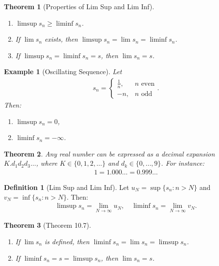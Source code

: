 \documentclass[7pt]{article}
\theoremstyle{definition}
\newtheorem{definition}{Definition}
\theoremstyle{plain}
\newtheorem{theorem}{Theorem}
\newtheorem{example}{Example}
\begin{document}
\begin{theorem}[Properties of Lim Sup and Lim Inf]

\begin{enumerate}
    \item $ \limsup s_n \geq \liminf s_n $.
    \item If $ \lim s_n $ exists, then $ \limsup s_n = \lim s_n = \liminf s_n $.
    \item If $ \limsup s_n = \liminf s_n = s $, then $ \lim s_n = s $.
\end{enumerate}
\end{theorem}

\begin{example}[Oscillating Sequence]
Let \begin{align} s_n = 
\begin{cases} 
\frac{1}{n}, & n \text{ even} \\
-n, & n \text{ odd}
\end{cases}.
\end{align}
Then:
\begin{enumerate}
    \item $ \limsup s_n = 0 $,
    \item $ \liminf s_n = -\infty $.
\end{enumerate}
\end{example}

\begin{theorem}
Any real number can be expressed as a decimal expansion $ K.d_1d_2d_3\ldots $, where $ K \in \{0, 1, 2, \dots \} $ and $ d_k \in \{0, \ldots, 9\} $. For instance:
\begin{align}
1 = 1.000\ldots = 0.999\ldots
\end{align}
\end{theorem}

\begin{definition}[Lim Sup and Lim Inf]
Let $ u_N = \sup\{s_n : n > N\} $ and $ v_N = \inf\{s_n : n > N\} $. Then:
\begin{align}
\limsup s_n = \lim_{N \to \infty} u_N, \quad \liminf s_n = \lim_{N \to \infty} v_N.
\end{align}
\end{definition}

\begin{theorem}[Theorem 10.7]

\begin{enumerate}
    \item If $ \lim s_n $ is defined, then $ \liminf s_n = \lim s_n = \limsup s_n $.
    \item If $ \liminf s_n = s = \limsup s_n $, then $ \lim s_n = s $.
\end{enumerate}
\end{theorem}
\end{document}
